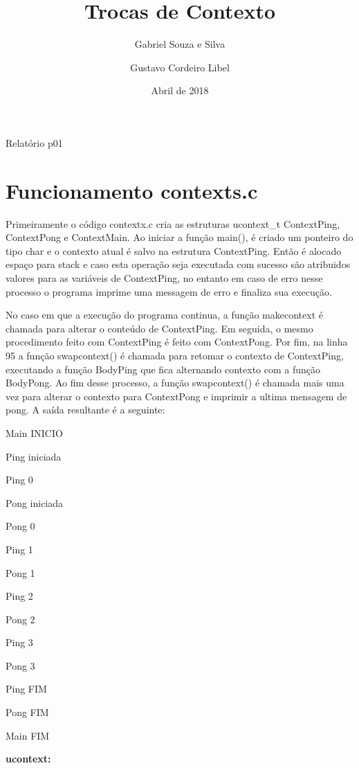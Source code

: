 \documentclass[12pt]{article}
\title{Trocas de Contexto} %
\author{Gabriel Souza e Silva \and Gustavo Cordeiro Libel} %
\date{Abril de 2018} %
\begin{document}
\maketitle %
\begin{center}
	Relatório p01
\end{center}


\section{Funcionamento contexts.c}
Primeiramente o código contextx.c cria as estruturas ucontext\_t ContextPing, ContextPong e ContextMain. Ao iniciar a função main(), é criado um ponteiro do tipo char e o contexto atual é salvo na estrutura ContextPing. Então é alocado espaço para stack e caso esta operação seja executada com sucesso são atribuidos valores para as variáveis de ContextPing, no entanto em caso de erro nesse processo o programa imprime uma messagem de erro e finaliza sua execução.

No caso em que a execução do programa continua, a função makecontext é chamada para alterar o conteúdo de ContextPing. Em seguida, o mesmo procedimento feito com ContextPing é feito com ContextPong. Por fim, na linha 95 a função swapcontext() é chamada para retomar o contexto de ContextPing, executando a função BodyPing que fica alternando contexto com a função BodyPong. Ao fim desse processo, a função swapcontext() é chamada mais uma vez para alterar o contexto para ContextPong e imprimir a ultima mensagem de pong. A saída resultante é a seguinte:

Main INICIO

Ping iniciada

Ping 0

Pong iniciada

Pong 0

Ping 1

Pong 1

Ping 2

Pong 2

Ping 3

Pong 3

Ping FIM

Pong FIM

Main FIM

\textbf{\large ucontext:}
\end{document}
